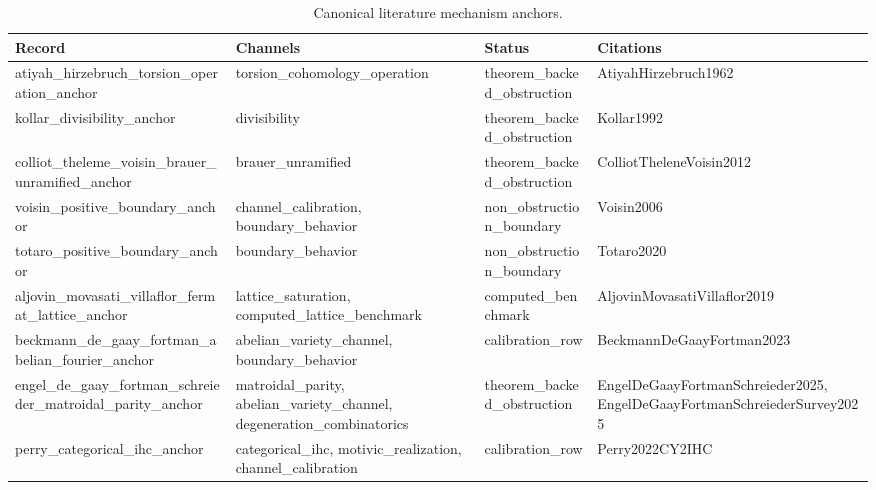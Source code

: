 \begin{table}[h]
\centering
\caption{Canonical literature mechanism anchors.}
\label{tab:canonical-literature-anchors}
\footnotesize
\renewcommand{\arraystretch}{1.18}
\begin{tabular}{|p{}|p{}|p{}|p{}|}
\hline
Record & Channels & Status & Citations \\
\hline
atiyah\_\allowbreak{}hirzebruch\_\allowbreak{}torsion\_\allowbreak{}operation\_\allowbreak{}anchor & torsion\_\allowbreak{}cohomology\_\allowbreak{}operation & theorem\_\allowbreak{}backed\_\allowbreak{}obstruction & AtiyahHirzebruch1962 \\
kollar\_\allowbreak{}divisibility\_\allowbreak{}anchor & divisibility & theorem\_\allowbreak{}backed\_\allowbreak{}obstruction & Kollar1992 \\
colliot\_\allowbreak{}theleme\_\allowbreak{}voisin\_\allowbreak{}brauer\_\allowbreak{}unramified\_\allowbreak{}anchor & brauer\_\allowbreak{}unramified & theorem\_\allowbreak{}backed\_\allowbreak{}obstruction & ColliotTheleneVoisin2012 \\
voisin\_\allowbreak{}positive\_\allowbreak{}boundary\_\allowbreak{}anchor & channel\_\allowbreak{}calibration, boundary\_\allowbreak{}behavior & non\_\allowbreak{}obstruction\_\allowbreak{}boundary & Voisin2006 \\
totaro\_\allowbreak{}positive\_\allowbreak{}boundary\_\allowbreak{}anchor & boundary\_\allowbreak{}behavior & non\_\allowbreak{}obstruction\_\allowbreak{}boundary & Totaro2020 \\
aljovin\_\allowbreak{}movasati\_\allowbreak{}villaflor\_\allowbreak{}fermat\_\allowbreak{}lattice\_\allowbreak{}anchor & lattice\_\allowbreak{}saturation, computed\_\allowbreak{}lattice\_\allowbreak{}benchmark & computed\_\allowbreak{}benchmark & AljovinMovasatiVillaflor2019 \\
beckmann\_\allowbreak{}de\_\allowbreak{}gaay\_\allowbreak{}fortman\_\allowbreak{}abelian\_\allowbreak{}fourier\_\allowbreak{}anchor & abelian\_\allowbreak{}variety\_\allowbreak{}channel, boundary\_\allowbreak{}behavior & calibration\_\allowbreak{}row & BeckmannDeGaayFortman2023 \\
engel\_\allowbreak{}de\_\allowbreak{}gaay\_\allowbreak{}fortman\_\allowbreak{}schreieder\_\allowbreak{}matroidal\_\allowbreak{}parity\_\allowbreak{}anchor & matroidal\_\allowbreak{}parity, abelian\_\allowbreak{}variety\_\allowbreak{}channel, degeneration\_\allowbreak{}combinatorics & theorem\_\allowbreak{}backed\_\allowbreak{}obstruction & EngelDeGaayFortmanSchreieder2025, EngelDeGaayFortmanSchreiederSurvey2025 \\
perry\_\allowbreak{}categorical\_\allowbreak{}ihc\_\allowbreak{}anchor & categorical\_\allowbreak{}ihc, motivic\_\allowbreak{}realization, channel\_\allowbreak{}calibration & calibration\_\allowbreak{}row & Perry2022CY2IHC \\
\hline
\end{tabular}
\end{table}
